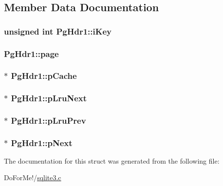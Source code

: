 \subsection{Member Data Documentation}
\hypertarget{struct_pg_hdr1_ad122ef74f5f0137414882aabd111a01b}{
\subsubsection[{i\-Key}]{\setlength{\rightskip}{0pt plus 5cm}unsigned int Pg\-Hdr1\-::i\-Key}}\label{struct_pg_hdr1_ad122ef74f5f0137414882aabd111a01b}
\hypertarget{struct_pg_hdr1_a121a9abbfea6b112ba77eeb84391ed47}{
\subsubsection[{page}]{ Pg\-Hdr1\-::page}}\label{struct_pg_hdr1_a121a9abbfea6b112ba77eeb84391ed47}
\hypertarget{struct_pg_hdr1_aa5b23de466773e72e1b6edf07b3a4570}{
\subsubsection[{p\-Cache}]{$\ast$ Pg\-Hdr1\-::p\-Cache}}\label{struct_pg_hdr1_aa5b23de466773e72e1b6edf07b3a4570}
\hypertarget{struct_pg_hdr1_ae22cfc3a39fe029a8f8fdd70e7ca4055}{
\subsubsection[{p\-Lru\-Next}]{$\ast$ Pg\-Hdr1\-::p\-Lru\-Next}}\label{struct_pg_hdr1_ae22cfc3a39fe029a8f8fdd70e7ca4055}
\hypertarget{struct_pg_hdr1_adf220ef63d6ceb782ac87a08aeb1722d}{
\subsubsection[{p\-Lru\-Prev}]{$\ast$ Pg\-Hdr1\-::p\-Lru\-Prev}}\label{struct_pg_hdr1_adf220ef63d6ceb782ac87a08aeb1722d}
\hypertarget{struct_pg_hdr1_acde43ab0ed0fbba33e526058d9c343b9}{
\subsubsection[{p\-Next}]{$\ast$ Pg\-Hdr1\-::p\-Next}}\label{struct_pg_hdr1_acde43ab0ed0fbba33e526058d9c343b9}


The documentation for this struct was generated from the following file\-:\begin{DoxyCompactItemize}
\item 
Do\-For\-Me!/\hyperlink{sqlite3_8c}{sqlite3.\-c}\end{DoxyCompactItemize}
